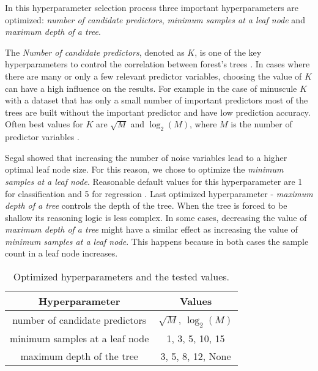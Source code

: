 In this hyperparameter selection process three important hyperparameters are optimized: \textit{number of candidate predictors}, \textit{minimum samples at a leaf node} and \textit{maximum depth of a tree}.

The \textit{Number of candidate predictors}, denoted as $K$, is one of the key hyperparameters to control the correlation between forest's trees \cite{probst2018hyperparameters}.
In cases where there are many or only a few relevant predictor variables, choosing the value of $K$ can have a high influence on the results. For example in the case of minuscule $K$ with a dataset that has only a small number of important predictors most of the trees are built without the important predictor and have low prediction accuracy. \cite{bernard2009influence} Often best values for $K$ are $\sqrt{M}$ and $\log_2(M)$, where $M$ is the number of predictor variables \cite{bernard2009influence}.

Segal \cite{segal2004machine} showed that increasing the number of noise variables lead to a higher optimal leaf node size. For this reason, we chose to optimize the \textit{minimum samples at a leaf node}. Reasonable default values for this hyperparameter are 1 for classification and 5 for regression \cite{probst2018hyperparameters}. Last optimized hyperparameter - \textit{maximum depth of a tree} controls the depth of the tree. When the tree is forced to be shallow its reasoning logic is less complex. In some cases, decreasing the value of \textit{maximum depth of a tree} might have a similar effect as increasing the value of \textit{minimum samples at a leaf node}. This happens because in both cases the sample count in a leaf node increases.

\begin{table}
    \caption{Optimized hyperparameters and the tested values.}
    \begin{tabular}{ | c | c |}
    \hline
    Hyperparameter & Values\\
    \hline
    number of candidate predictors & $\sqrt{M}$, $\log_2(M)$\\
    minimum samples at a leaf node & 1, 3, 5, 10, 15\\
    maximum depth of the tree & 3, 5, 8, 12, None\\
    \hline
   \end{tabular}
   \label{tab:hyperparam}
\end{table}

